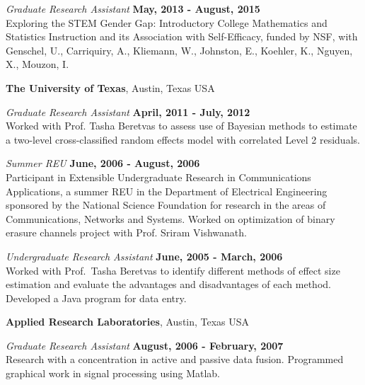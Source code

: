 \documentclass[margin,line]{res}
\begin{document}
\begin{resume}
{\em Graduate Research Assistant} \hfill {\bf May, 2013 - August, 2015}\\
Exploring the STEM Gender Gap: Introductory College Mathematics and Statistics Instruction and its Association with Self-Efficacy, funded by NSF, with Genschel, U., Carriquiry, A., Kliemann, W., Johnston, E., Koehler, K., Nguyen, X., Mouzon, I.

{\bf The University of Texas}, Austin, Texas USA

\vspace{-.3cm}
{\em Graduate Research Assistant} \hfill {\bf April, 2011 - July, 2012}\\
Worked with Prof. Tasha Beretvas to assess use of Bayesian methods to estimate a two-level cross-classified random effects model with correlated Level 2 residuals.




{\em Summer REU} \hfill {\bf June, 2006 - August, 2006}\\
Participant in Extensible Undergraduate Research in Communications Applications, a summer REU in the Department of Electrical Engineering sponsored by the National Science Foundation for research in the areas of Communications, Networks and Systems. Worked on optimization of binary erasure channels project with Prof. Sriram Vishwanath.

{\em Undergraduate Research Assistant} \hfill {\bf June, 2005 - March, 2006}\\
Worked with Prof.\ Tasha Beretvas to identify different methods of effect size estimation and evaluate the advantages and disadvantages of each method. Developed a Java program for data entry.

\vspace{-.1cm}
{\bf Applied Research Laboratories}, Austin, Texas USA

\vspace{-.3cm}
{\em Graduate Research Assistant} \hfill {\bf August, 2006 - February, 2007}\\
Research with a concentration in active and passive data fusion. Programmed graphical work in signal processing using Matlab.


\end{resume}
\end{document}
